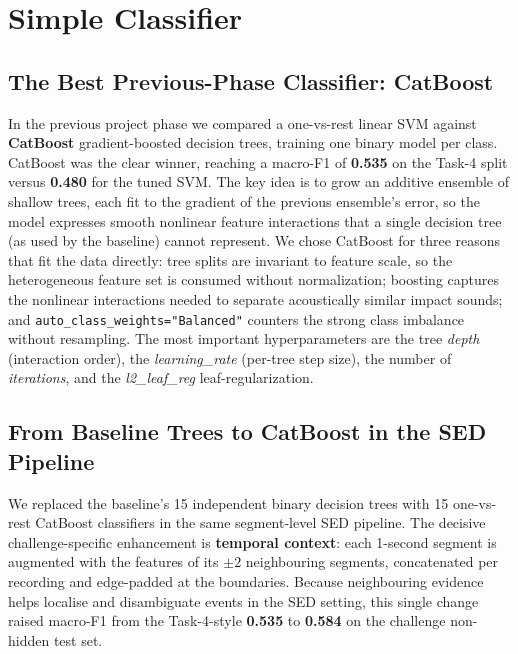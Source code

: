 \documentclass{article}
\begin{document}
\section{Simple Classifier}

\subsection{The Best Previous-Phase Classifier: CatBoost}

In the previous project phase we compared a one-vs-rest linear SVM against \textbf{CatBoost} gradient-boosted decision trees, training one binary model per class. CatBoost was the clear winner, reaching a macro-F1 of \textbf{0.535} on the Task-4 split versus \textbf{0.480} for the tuned SVM. The key idea is to grow an additive ensemble of shallow trees, each fit to the gradient of the previous ensemble's error, so the model expresses smooth nonlinear feature interactions that a single decision tree (as used by the baseline) cannot represent. We chose CatBoost for three reasons that fit the data directly: tree splits are invariant to feature scale, so the heterogeneous feature set is consumed without normalization; boosting captures the nonlinear interactions needed to separate acoustically similar impact sounds; and \texttt{auto\_class\_weights="Balanced"} counters the strong class imbalance without resampling. The most important hyperparameters are the tree \emph{depth} (interaction order), the \emph{learning\_rate} (per-tree step size), the number of \emph{iterations}, and the \emph{l2\_leaf\_reg} leaf-regularization.

\subsection{From Baseline Trees to CatBoost in the SED Pipeline}

We replaced the baseline's 15 independent binary decision trees with 15 one-vs-rest CatBoost classifiers in the same segment-level SED pipeline. The decisive challenge-specific enhancement is \textbf{temporal context}: each 1-second segment is augmented with the features of its $\pm2$ neighbouring segments, concatenated per recording and edge-padded at the boundaries. Because neighbouring evidence helps localise and disambiguate events in the SED setting, this single change raised macro-F1 from the Task-4-style \textbf{0.535} to \textbf{0.584} on the challenge non-hidden test set.
\end{document}
